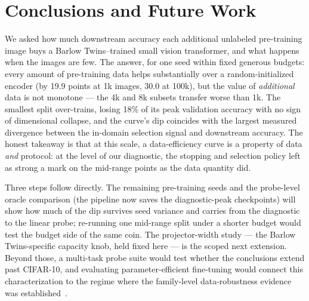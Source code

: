 \section{Conclusions and Future Work}
\label{sec:conclusion}

We asked how much downstream accuracy each additional unlabeled
pre-training image buys a Barlow Twins--trained small vision transformer,
and what happens when the images are few. The answer, for one seed within
fixed generous budgets: every amount of pre-training data helps
substantially over a random-initialized encoder (by 19.9 points at 1k
images, 30.0 at 100k), but the value of \emph{additional} data is not
monotone --- the 4k and 8k subsets transfer worse than 1k. The smallest
split over-trains, losing 18\% of its peak validation accuracy with no
sign of dimensional collapse, and the curve's dip coincides with the
largest measured divergence between the in-domain selection signal and
downstream accuracy. The honest takeaway is that at this scale, a
data-efficiency curve is a property of data \emph{and} protocol: at the
level of our diagnostic, the stopping and selection policy left as strong a
mark on the mid-range points as the data quantity did.

Three steps follow directly. The remaining pre-training seeds and the
probe-level oracle comparison (the pipeline now saves the diagnostic-peak
checkpoints) will show how much of the dip survives seed variance and
carries from the diagnostic to the linear probe; re-running one mid-range split
under a shorter budget would test the budget side of the same coin. The
projector-width study --- the Barlow Twins-specific capacity knob, held
fixed here --- is the scoped next extension. Beyond those, a multi-task probe suite would test whether the
conclusions extend past CIFAR-10, and evaluating parameter-efficient
fine-tuning would connect this characterization to the regime where the
family-level data-robustness evidence was
established~\cite{elnouby2021largescale}.
